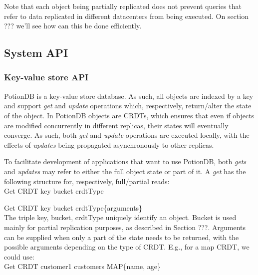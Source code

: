 \documentclass{vldb}
\begin{document}
Note that each object being partially replicated does not prevent queries that refer to data replicated in different datacenters from being executed.
On section ??? %
we'll see how can this be done efficiently.

\subsection{System API}

\subsubsection{Key-value store API}

PotionDB is a key-value store database. %
As such, all objects are indexed by a key and support  \emph{get} and \emph{update} operations which, respectively, return/alter the state of the object.
In PotionDB objects are CRDTs, %
which ensures that even if objects are modified concurrently in different replicas, their states will eventually converge.
As such, both \emph{get} and \emph{update} operations are executed locally, with the effects of \emph{updates} being propagated asynchronously to other replicas.

To facilitate development of applications that want to use PotionDB, both \emph{gets} and \emph{updates} may refer to either the full object state or part of it.
A \emph{get} has the following structure for, respectively, full/partial reads: \\

Get CRDT key bucket crdtType 

Get CRDT key bucket crdtType\{arguments\} \\ 

The triple key, bucket, crdtType uniquely identify an object. 
Bucket is used mainly for partial replication purposes, as described in Section ???. %
Arguments can be supplied when only a part of the state needs to be returned, with the possible arguments depending on the type of CRDT. E.g., for a map CRDT, we could use: \\

Get CRDT customer1 customers MAP\{name, age\}\\
\end{document}
